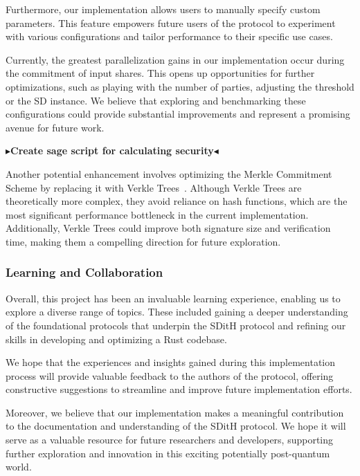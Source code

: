 \documentclass[11pt]{report}
\theoremstyle{definition}
\theoremstyle{plain}
\newcommand{\todo}[1]{{\color[rgb]{.5,0,0}\textbf{$\blacktriangleright$#1$\blacktriangleleft$}}}
\begin{document}
Furthermore, our implementation allows users to manually specify custom parameters. This feature empowers future users of the protocol to experiment with various configurations and tailor performance to their specific use cases.

Currently, the greatest parallelization gains in our implementation occur during the commitment of input shares. This opens up opportunities for further optimizations, such as playing with the number of parties, adjusting the threshold or the SD instance. We believe that exploring and benchmarking these configurations could provide substantial improvements and represent a promising avenue for future work.

\todo{Create sage script for calculating security}

Another potential enhancement involves optimizing the Merkle Commitment Scheme by replacing it with Verkle Trees~\cite{kuszmaul2019verkle, iavich2023verkle}. Although Verkle Trees are theoretically more complex, they avoid reliance on hash functions, which are the most significant performance bottleneck in the current implementation. Additionally, Verkle Trees could improve both signature size and verification time, making them a compelling direction for future exploration.

\subsubsection{Learning and Collaboration}
Overall, this project has been an invaluable learning experience, enabling us to explore a diverse range of topics. These included gaining a deeper understanding of the foundational protocols that underpin the SDitH protocol and refining our skills in developing and optimizing a Rust codebase.

We hope that the experiences and insights gained during this implementation process will provide valuable feedback to the authors of the protocol, offering constructive suggestions to streamline and improve future implementation efforts.

Moreover, we believe that our implementation makes a meaningful contribution to the documentation and understanding of the SDitH protocol. We hope it will serve as a valuable resource for future researchers and developers, supporting further exploration and innovation in this exciting potentially post-quantum world.


\end{document}
